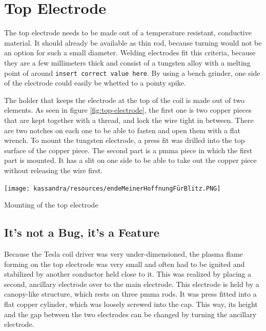 \section{Top Electrode}

The top electrode needs to be made out of a temperature resistant, conductive material. It should already be available as thin rod, because turning would not be an option for such a small diameter. Welding electrodes fit this criteria, because they are a few millimeters thick and consist of a tungsten alloy with a melting point of around \texttt{insert correct value here}. By using a bench grinder, one side of the electrode could easily be whetted to a pointy spike.

The holder that keeps the electrode at the top of the coil is made out of two elements. As seen in figure \ref{fig:top-electrode}, the first one is two copper pieces that are kept together with a thread, and lock the wire tight in between. There are two notches on each one to be able to fasten and open them with a flat wrench. To mount the tungsten electrode, a press fit was drilled into the top surface of the copper piece. The second part is a \gls{pmma} piece in which the first part is mounted. It has a slit on one side to be able to take out the copper piece without releasing the wire first.

\begin{marginfigure}[-8cm]
    \centering
    \texttt{[image: kassandra/resources/endeMeinerHoffnungFürBlitz.PNG]}
    \caption{Mounting of the top electrode}
    \label{fig:top-electrode}
\end{marginfigure}

\subsection{It's not a Bug, it's a Feature}

Because the Tesla coil driver was very under-dimensioned, the plasma flame forming on the top electrode was very small and often had to be ignited and stabilized by another conductor held close to it. This was realized by placing a second, ancillary electrode over to the main electrode. This electrode is held by a canopy-like structure, which rests on three \gls{pmma} rods. It was press fitted into a flat copper cylinder, which was loosely screwed into the cap. This way, its height and the gap between the two electrodes can be changed by turning the ancillary electrode.

